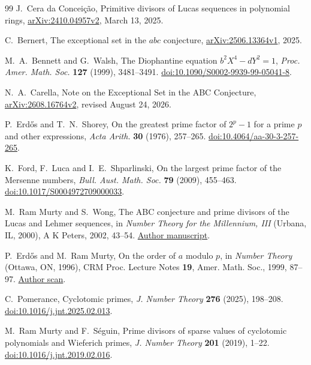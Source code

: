 \documentclass[11pt]{amsart}
\theoremstyle{definition}
\theoremstyle{remark}
\begin{document}
\begin{thebibliography}{99}
J.~Cera da Concei\c{c}\~ao,
Primitive divisors of Lucas sequences in polynomial rings,
\href{https://arxiv.org/abs/2410.04957v2}{arXiv:2410.04957v2},
March 13, 2025.

C.~Bernert, The exceptional set in the $abc$ conjecture,
\href{https://arxiv.org/abs/2506.13364v1}{arXiv:2506.13364v1}, 2025.

M.~A.~Bennett and G.~Walsh, The Diophantine equation $b^2X^4-dY^2=1$,
\emph{Proc. Amer. Math. Soc.} \textbf{127} (1999), 3481--3491.
\href{https://doi.org/10.1090/S0002-9939-99-05041-8}{doi:10.1090/S0002-9939-99-05041-8}.

N.~A.~Carella, Note on the Exceptional Set in the ABC Conjecture,
\href{https://arxiv.org/abs/2608.16764v2}{arXiv:2608.16764v2},
revised August 24, 2026.

P.~Erd\H{o}s and T.~N.~Shorey,
On the greatest prime factor of $2^p-1$ for a prime $p$ and other
expressions,
\emph{Acta Arith.} \textbf{30} (1976), 257--265.
\href{https://doi.org/10.4064/aa-30-3-257-265}%
{doi:10.4064/aa-30-3-257-265}.

K.~Ford, F.~Luca and I.~E.~Shparlinski,
On the largest prime factor of the Mersenne numbers,
\emph{Bull. Aust. Math. Soc.} \textbf{79} (2009), 455--463.
\href{https://doi.org/10.1017/S0004972709000033}%
{doi:10.1017/S0004972709000033}.

M.~Ram Murty and S.~Wong,
The ABC conjecture and prime divisors of the Lucas and Lehmer sequences,
in \emph{Number Theory for the Millennium, III} (Urbana, IL, 2000),
A K Peters, 2002, 43--54.
\href{https://mast.queensu.ca/~murty/murty-wong.pdf}{Author manuscript}.

P.~Erd\H{o}s and M.~Ram Murty,
On the order of $a$ modulo $p$,
in \emph{Number Theory} (Ottawa, ON, 1996),
CRM Proc. Lecture Notes \textbf{19}, Amer. Math. Soc., 1999, 87--97.
\href{https://mast.queensu.ca/~murty/erdos-ram.pdf}{Author scan}.

C.~Pomerance,
Cyclotomic primes,
\emph{J. Number Theory} \textbf{276} (2025), 198--208.
\href{https://doi.org/10.1016/j.jnt.2025.02.013}%
{doi:10.1016/j.jnt.2025.02.013}.

M.~Ram Murty and F.~S\'eguin,
Prime divisors of sparse values of cyclotomic polynomials and Wieferich
primes,
\emph{J. Number Theory} \textbf{201} (2019), 1--22.
\href{https://doi.org/10.1016/j.jnt.2019.02.016}%
{doi:10.1016/j.jnt.2019.02.016}.


\end{thebibliography}
\end{document}
